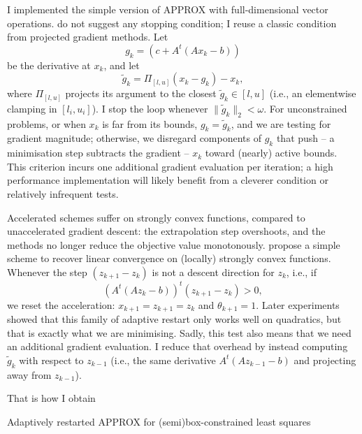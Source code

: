 \documentclass{article}
\begin{document}
I implemented the simple version of APPROX with full-dimensional
vector operations.  \citep{Fercoq:2013wv} do not suggest any stopping
condition; I reuse a classic condition from projected gradient
methods.  Let
\[g_k = (c+A^t(Ax_k-b))\]
be the derivative at \(x_k\), and let
\[\tilde{g}_k = \Pi_{[l,u]}(x_k-g_k)-x_k,\]
where \(\Pi_{[l,u]}\) projects its argument to the closest
\(\tilde{g}_k\in [l, u]\) (i.e., an elementwise clamping in
\([l_i,u_i]\)).  I stop the loop whenever
\(\|\tilde{g}_k\|_2<\omega\).  For unconstrained problems, or when
\(x_k\) is far from its bounds, \(g_k = \tilde{g}_k\), and we are
testing for gradient magnitude; otherwise, we disregard components of
\(g_k\) that push -- a minimisation step subtracts the gradient -- \(x_k\)
toward (nearly) active bounds.  This criterion incurs one additional
gradient evaluation per iteration; a high performance implementation
will likely benefit from a cleverer condition or relatively infrequent
tests.

Accelerated schemes suffer on strongly convex functions, compared to
unaccelerated gradient descent: the extrapolation step overshoots, and
the methods no longer reduce the objective value monotonously.
\citep{ODonoghue:2012wca} propose a simple scheme to recover linear
convergence on (locally) strongly convex functions.  Whenever the step
\((z_{k+1}-z_k)\) is not a descent direction for \(z_k\), i.e., if 
\[(A^t(Az_k -b))^t(z_{k+1}-z_k)>0,\]
we reset the acceleration:
\(x_{k+1} = z_{k+1} = z_k\) and \(\theta_{k+1} = 1\).  Later
experiments \citep{Lin:2013wi} showed that this family of adaptive
restart only works well on quadratics, but that is exactly what we are
minimising.  Sadly, this test also means that we need an additional
gradient evaluation.  I reduce that overhead by instead computing
\(\tilde{g}_k\) with respect to \(z_{k-1}\) (i.e., the same derivative
\(A^t(Az_{k-1}-b)\) and projecting away from \(z_{k-1}\)).

That is how I obtain
\begin{algorithm}[h]
\caption{Adaptively restarted APPROX for (semi)box-constrained least squares}
\begin{algorithmic}
\REPEAT
 \ELSE
 \ENDIF
\end{algorithmic}
\end{algorithm}
\end{document}
